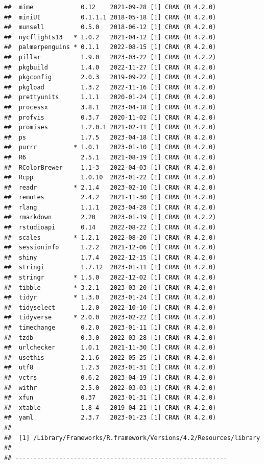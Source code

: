 \documentclass[print]{nuthesis}
\begin{document}
\begin{verbatim}
##  mime             0.12    2021-09-28 [1] CRAN (R 4.2.0)
##  miniUI           0.1.1.1 2018-05-18 [1] CRAN (R 4.2.0)
##  munsell          0.5.0   2018-06-12 [1] CRAN (R 4.2.0)
##  nycflights13   * 1.0.2   2021-04-12 [1] CRAN (R 4.2.0)
##  palmerpenguins * 0.1.1   2022-08-15 [1] CRAN (R 4.2.0)
##  pillar           1.9.0   2023-03-22 [1] CRAN (R 4.2.2)
##  pkgbuild         1.4.0   2022-11-27 [1] CRAN (R 4.2.0)
##  pkgconfig        2.0.3   2019-09-22 [1] CRAN (R 4.2.0)
##  pkgload          1.3.2   2022-11-16 [1] CRAN (R 4.2.0)
##  prettyunits      1.1.1   2020-01-24 [1] CRAN (R 4.2.0)
##  processx         3.8.1   2023-04-18 [1] CRAN (R 4.2.0)
##  profvis          0.3.7   2020-11-02 [1] CRAN (R 4.2.0)
##  promises         1.2.0.1 2021-02-11 [1] CRAN (R 4.2.0)
##  ps               1.7.5   2023-04-18 [1] CRAN (R 4.2.0)
##  purrr          * 1.0.1   2023-01-10 [1] CRAN (R 4.2.0)
##  R6               2.5.1   2021-08-19 [1] CRAN (R 4.2.0)
##  RColorBrewer     1.1-3   2022-04-03 [1] CRAN (R 4.2.0)
##  Rcpp             1.0.10  2023-01-22 [1] CRAN (R 4.2.0)
##  readr          * 2.1.4   2023-02-10 [1] CRAN (R 4.2.0)
##  remotes          2.4.2   2021-11-30 [1] CRAN (R 4.2.0)
##  rlang            1.1.1   2023-04-28 [1] CRAN (R 4.2.0)
##  rmarkdown        2.20    2023-01-19 [1] CRAN (R 4.2.2)
##  rstudioapi       0.14    2022-08-22 [1] CRAN (R 4.2.0)
##  scales         * 1.2.1   2022-08-20 [1] CRAN (R 4.2.0)
##  sessioninfo      1.2.2   2021-12-06 [1] CRAN (R 4.2.0)
##  shiny            1.7.4   2022-12-15 [1] CRAN (R 4.2.0)
##  stringi          1.7.12  2023-01-11 [1] CRAN (R 4.2.0)
##  stringr        * 1.5.0   2022-12-02 [1] CRAN (R 4.2.0)
##  tibble         * 3.2.1   2023-03-20 [1] CRAN (R 4.2.0)
##  tidyr          * 1.3.0   2023-01-24 [1] CRAN (R 4.2.0)
##  tidyselect       1.2.0   2022-10-10 [1] CRAN (R 4.2.0)
##  tidyverse      * 2.0.0   2023-02-22 [1] CRAN (R 4.2.0)
##  timechange       0.2.0   2023-01-11 [1] CRAN (R 4.2.0)
##  tzdb             0.3.0   2022-03-28 [1] CRAN (R 4.2.0)
##  urlchecker       1.0.1   2021-11-30 [1] CRAN (R 4.2.0)
##  usethis          2.1.6   2022-05-25 [1] CRAN (R 4.2.0)
##  utf8             1.2.3   2023-01-31 [1] CRAN (R 4.2.0)
##  vctrs            0.6.2   2023-04-19 [1] CRAN (R 4.2.0)
##  withr            2.5.0   2022-03-03 [1] CRAN (R 4.2.0)
##  xfun             0.37    2023-01-31 [1] CRAN (R 4.2.0)
##  xtable           1.8-4   2019-04-21 [1] CRAN (R 4.2.0)
##  yaml             2.3.7   2023-01-23 [1] CRAN (R 4.2.0)
## 
##  [1] /Library/Frameworks/R.framework/Versions/4.2/Resources/library
## 
## ----------------------------------------------------------
\end{verbatim}
\end{document}
